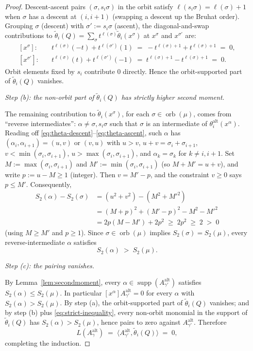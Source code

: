 \documentclass[11pt]{article}
\theoremstyle{definition}
\theoremstyle{remark}
\newcommand{\orb}{\operatorname{orb}}
\newcommand{\supp}{\operatorname{supp}}
\newcommand{\Aalt}{A^{\mathrm{alt}}}
\newcommand{\thetaalt}{\theta^{\mathrm{alt}}}
\begin{document}
\begin{proof}
Descent-ascent pairs $(\sigma, s_i\sigma)$ in the orbit satisfy
$\ell(s_i\sigma) = \ell(\sigma)+1$ when $\sigma$ has a descent at $(i,i+1)$
(swapping a descent up the Bruhat order). Grouping $\sigma$ (descent) with
$\sigma' := s_i\sigma$ (ascent), the diagonal-and-swap contributions to
$\widetilde\theta_i(Q) = \sum_\sigma t^{\ell(\sigma)} \widetilde\theta_i(x^\sigma)$ at $x^\sigma$ and $x^{\sigma'}$
are:
\begin{align*}
  {[x^\sigma]}: \quad & t^{\ell(\sigma)}(-t) + t^{\ell(\sigma')}(1) \;=\; -t^{\ell(\sigma)+1} + t^{\ell(\sigma)+1} \;=\; 0,\\
  {[x^{\sigma'}]}: \quad & t^{\ell(\sigma)}(t) + t^{\ell(\sigma')}(-1) \;=\; t^{\ell(\sigma)+1} - t^{\ell(\sigma)+1} \;=\; 0.
\end{align*}
Orbit elements fixed by $s_i$ contribute $0$ directly.
Hence the orbit-supported part of $\widetilde\theta_i(Q)$ vanishes.

\medskip\noindent\emph{Step (b): the non-orbit part of $\widetilde\theta_i(Q)$ has strictly
higher second moment.}

The remaining contribution to $\widetilde\theta_i(x^\sigma)$, for each $\sigma \in \orb(\mu)$,
comes from ``reverse intermediates'': $\alpha \ne \sigma, s_i\sigma$ such that $\sigma$
is an intermediate of $\thetaalt_i(x^\alpha)$.
Reading off \eqref{eq:theta-descent}--\eqref{eq:theta-ascent}, such $\alpha$ has
$(\alpha_i,\alpha_{i+1}) = (u,v)$ or $(v,u)$ with $u > v$, $u + v = \sigma_i + \sigma_{i+1}$,
$v < \min(\sigma_i,\sigma_{i+1})$, $u > \max(\sigma_i,\sigma_{i+1})$, and
$\alpha_k = \sigma_k$ for $k \ne i,i+1$. Set
$M := \max(\sigma_i,\sigma_{i+1})$ and $M' := \min(\sigma_i,\sigma_{i+1})$
(so $M + M' = u + v$), and write $p := u - M \ge 1$ (integer). Then $v = M' - p$,
and the constraint $v \ge 0$ says $p \le M'$. Consequently,
\begin{align*}
  S_2(\alpha) - S_2(\sigma)
  &= (u^2 + v^2) - (M^2 + {M'}^2)\\
  &= (M+p)^2 + (M'-p)^2 - M^2 - {M'}^2\\
  &= 2p(M - M') + 2p^2 \;\ge\; 2p^2 \;\ge\; 2 \;>\; 0
\end{align*}
(using $M \ge M'$ and $p \ge 1$). Since $\sigma \in \orb(\mu)$ implies
$S_2(\sigma) = S_2(\mu)$, every reverse-intermediate $\alpha$ satisfies
\begin{equation}\label{eq:strict-inequality}
  S_2(\alpha) \;>\; S_2(\mu).
\end{equation}

\medskip\noindent\emph{Step (c): the pairing vanishes.}

By Lemma~\ref{lem:secondmoment}, every $\alpha \in \supp(\Aalt_{\gamma'})$
satisfies $S_2(\alpha) \le S_2(\mu)$. In particular
$[x^\alpha]\Aalt_{\gamma'} = 0$ for every $\alpha$ with $S_2(\alpha) > S_2(\mu)$.
By step (a), the orbit-supported part of $\widetilde\theta_i(Q)$ vanishes; and by
step (b) plus \eqref{eq:strict-inequality}, every non-orbit monomial in the
support of $\widetilde\theta_i(Q)$ has $S_2(\alpha) > S_2(\mu)$, hence pairs to zero
against $\Aalt_{\gamma'}$. Therefore
\[
  L(\Aalt_\gamma) \;=\; \langle \Aalt_{\gamma'}, \widetilde\theta_i(Q) \rangle \;=\; 0,
\]
completing the induction.
\end{proof}
\end{document}
